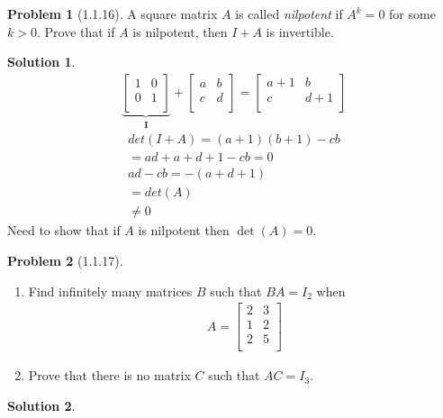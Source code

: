 \documentclass[12pt]{article}
\theoremstyle{definition} %
\newtheorem{solution}{Solution}
\newtheorem{problem}{Problem}
\theoremstyle{plain} %
\begin{document}
\begin{problem}[1.1.16]
A square matrix $A$ is called \emph{nilpotent} if $A^{k}=0$ for some $k>0$. Prove that if $A$ is nilpotent, then $I+A$ is invertible.   
\end{problem}
\begin{solution}
\begin{align}
    \underbrace{\begin{bmatrix}
    1 &  0 \\
    0 &  1 \\
   \end{bmatrix}}_{\mathbf{I} }+ \begin{bmatrix}
    a &b   \\
     c&d   \\
   \end{bmatrix} = \begin{bmatrix}
    a+1 &  b \\
    c & d+1  \\
   \end{bmatrix}
\end{align}
      \begin{align}
    det(I+A)= (a+1)(b+1)-cb \\[10pt] 
    =ad+a+d+1-cb = 0\\[10pt] 
    ad-cb = -(a+d+1)\\[10pt] 
    =det(A) \\[10pt] 
    \neq 0 
   \end{align}  
   Need to show that if $A$ is nilpotent then $\det(A)=0$. 
\end{solution}
\begin{problem}[1.1.17]
   \begin{enumerate}
    \item Find infinitely many matrices $B$ such that $BA=I_2$ when 
    \begin{align}
        A= \begin{bmatrix}
            2 &  3 \\
            1 &  2 \\
            2 &  5 \\
        \end{bmatrix}
    \end{align}
    \item Prove that there is no matrix $C$ such that $AC=I_3$. 
   \end{enumerate} 
\end{problem}
\begin{solution}

\end{solution}
\end{document}

